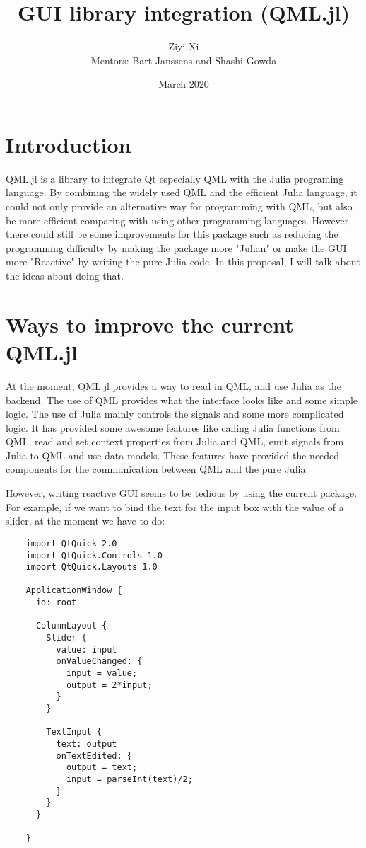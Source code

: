 \documentclass[12pt]{extarticle}
\title{GUI library integration (QML.jl)}
\author{Ziyi Xi\\
Mentors: Bart Janssens and Shashi Gowda}
\date{March 2020}
\begin{document}
\maketitle

\section{Introduction}
QML.jl is a library to integrate Qt especially QML with the Julia programing language. By combining the widely used QML and the efficient Julia language, it 
could not only provide an alternative way for programming with QML, but also be more efficient comparing with using other programming languages. However, there could still be 
some improvements for this package such as reducing the programming difficulty by making the package more "Julian" or make the GUI more "Reactive" by writing the pure
Julia code. In this proposal, I will talk about the ideas about doing that.

\section{Ways to improve the current QML.jl}

At the moment, QML.jl provides a way to read in QML, and use Julia as the backend. The use of QML 
provides what the interface looks like and some simple logic. The use of Julia mainly controls the signals and some more complicated
logic. It has provided some awesome features like calling Julia functions from QML, read and set context properties from Julia and QML,
emit signals from Julia to QML and use data models. These features have provided the needed components for the communication between QML 
and the pure Julia.

However, writing reactive GUI seems to be tedious by using the current package. For example, if we want to bind the text
for the input box with the value of a slider, at the moment we have to do:

\begin{verbatim}
    import QtQuick 2.0
    import QtQuick.Controls 1.0
    import QtQuick.Layouts 1.0
    
    ApplicationWindow {
      id: root
    
      ColumnLayout {    
        Slider {
          value: input
          onValueChanged: {
            input = value;
            output = 2*input;
          }
        }
    
        TextInput {
          text: output
          onTextEdited: {
            output = text;
            input = parseInt(text)/2;
          }
        }
      }
    
    }
\end{verbatim}
\end{document}
